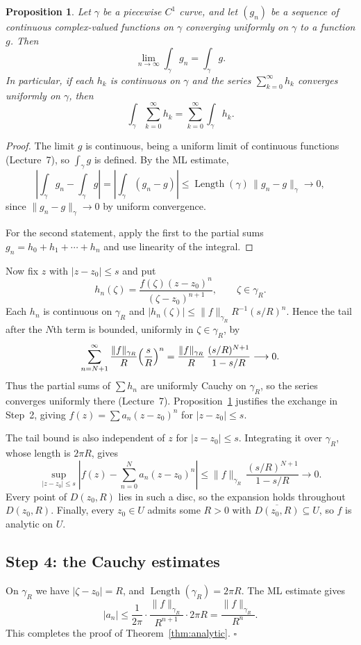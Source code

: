 \documentclass[11pt]{article}
\theoremstyle{plain}
\newtheorem{proposition}[theorem]{Proposition}
\theoremstyle{definition}
\theoremstyle{remark}
\numberwithin{equation}{section}
\begin{document}
\begin{proposition}\label{prop:uniform-integral}
Let $\gamma$ be a piecewise $C^1$ curve, and let $(g_n)$ be a sequence of
continuous complex-valued functions on $\gamma$ converging uniformly on
$\gamma$ to a function $g$. Then
\[
 \lim_{n\to\infty}\int_\gamma g_n=\int_\gamma g.
\]
In particular, if each $h_k$ is continuous on $\gamma$ and the series
$\sum_{k=0}^{\infty}h_k$ converges uniformly on $\gamma$, then
\[
\int_\gamma\sum_{k=0}^{\infty}h_k=\sum_{k=0}^{\infty}\int_\gamma h_k.
\]
\end{proposition}
\begin{proof}
The limit $g$ is continuous, being a uniform limit of continuous
functions (Lecture~7), so $\int_\gamma g$ is defined. By the ML estimate,
\[
 \left|\int_\gamma g_n-\int_\gamma g\right|
 =\left|\int_\gamma (g_n-g)\right|
 \leq\operatorname{Length}(\gamma)\,\|g_n-g\|_\gamma
 \longrightarrow0,
\]
since $\|g_n-g\|_\gamma\to0$ by uniform convergence.

For the second statement, apply the first to the partial sums
$g_n=h_0+h_1+\cdots+h_n$ and use linearity of the integral.
\end{proof}

Now fix $z$ with $|z-z_0|\leq s$ and put
\[
 h_n(\zeta)=\frac{f(\zeta)(z-z_0)^n}{(\zeta-z_0)^{n+1}},\qquad\zeta\in\gamma_R.
\]
Each $h_n$ is continuous on $\gamma_R$ and
$|h_n(\zeta)|\leq\|f\|_{\gamma_R}R^{-1}(s/R)^n$. Hence the tail after
the $N$th term is bounded, uniformly in $\zeta\in\gamma_R$, by
\[
 \sum_{n=N+1}^{\infty}\frac{\|f\|_{\gamma_R}}{R}\Bigl(\frac sR\Bigr)^n
 =\frac{\|f\|_{\gamma_R}}{R}\,\frac{(s/R)^{N+1}}{1-s/R}\longrightarrow0.
\]
Thus the partial sums of $\sum h_n$ are uniformly Cauchy on $\gamma_R$,
so the series converges uniformly there (Lecture~7).
Proposition~\ref{prop:uniform-integral} justifies the exchange in Step~2,
giving $f(z)=\sum a_n(z-z_0)^n$ for $|z-z_0|\leq s$.

The tail bound is also independent of $z$ for $|z-z_0|\leq s$.
Integrating it over $\gamma_R$, whose length is $2\pi R$, gives
\[
 \sup_{|z-z_0|\leq s}
 \left|f(z)-\sum_{n=0}^{N}a_n(z-z_0)^n\right|
 \leq\|f\|_{\gamma_R}\,\frac{(s/R)^{N+1}}{1-s/R}\longrightarrow 0.
\]
Every point of $D(z_0,R)$ lies in such a disc, so the expansion holds throughout
$D(z_0,R)$. Finally, every $z_0\in U$ admits some $R>0$ with
$\overline{D(z_0,R)}\subseteq U$, so $f$ is analytic on $U$.

\subsection{Step 4: the Cauchy estimates}
On $\gamma_R$ we have $|\zeta-z_0|=R$, and $\operatorname{Length}(\gamma_R)=2\pi R$.
The ML estimate gives
\[
 |a_n|\leq\frac{1}{2\pi}\cdot\frac{\|f\|_{\gamma_R}}{R^{n+1}}
 \cdot2\pi R=\frac{\|f\|_{\gamma_R}}{R^n}.
\]
This completes the proof of Theorem~\ref{thm:analytic}. \hfill$\square$
\end{document}
